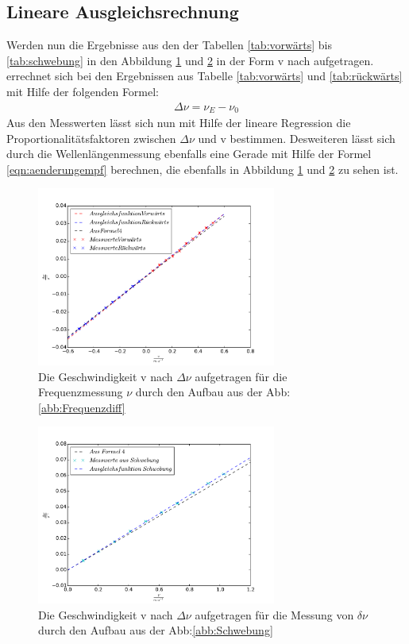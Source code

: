 \subsection{Lineare Ausgleichsrechnung}
Werden nun die Ergebnisse aus den der Tabellen \ref{tab:vorwärts} bis \ref{tab:schwebung}
in den Abbildung \ref{abb:freq} und \ref{abb:schw} in der Form  v nach \Delta\nu aufgetragen.
\Delta\nu errechnet sich bei den Ergebnissen aus Tabelle \ref{tab:vorwärts} und \ref{tab:rückwärts}
mit Hilfe der folgenden Formel:
\begin{align}
\Delta\nu=\nu_E-\nu_0
\end{align}
Aus den Messwerten lässt sich nun mit Hilfe der lineare Regression
die Proportionalitätsfaktoren zwischen $\Delta\nu$ und v bestimmen.
Desweiteren lässt sich durch die Wellenlängenmessung ebenfalls eine Gerade mit Hilfe der Formel \eqref{eqn:aenderungempf}
berechnen, die ebenfalls in Abbildung \ref{abb:freq} und \ref{abb:schw} zu sehen ist.
\begin{figure}
\centering
\includegraphics[width=0.7\textwidth]{graph.pdf}
\caption{Die Geschwindigkeit v nach $\Delta\nu $ aufgetragen für die Frequenzmessung $\nu$ durch den Aufbau aus der Abb:\ref{abb:Frequenzdiff}}
\label{abb:freq}
\end{figure}
\begin{figure}
\centering
\includegraphics[width=0.7\textwidth]{graph2.pdf}
\caption{Die Geschwindigkeit v nach $\Delta\nu $ aufgetragen für die Messung von $\delta\nu$ durch den Aufbau aus der Abb:\ref{abb:Schwebung}}
\label{abb:schw}
\end{figure}
